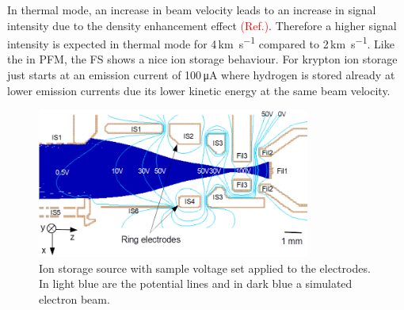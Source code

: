 		In thermal mode, an increase in beam velocity leads to an increase in signal intensity due to the density enhancement effect \textcolor{red}{(Ref.)}. Therefore a higher signal intensity is expected in thermal mode for 4\,\si{\kilo\meter\per\second} compared to 2\,\si{\kilo\meter\per\second}. 
		Like the in PFM, the FS shows a nice ion storage behaviour. For krypton ion storage just starts at an emission current of 100\,\si{\micro\ampere} where hydrogen is stored already at lower emission currents due its lower kinetic energy at the same beam velocity.
		
		\begin{figure}[h]
			\centering
			\includegraphics[width = 0.8\textwidth]{Experiments/FiL_IS_elBeam_Storage.png}
			\caption{Ion storage source with sample voltage set applied to the electrodes. In light blue are the potential lines and in dark blue a simulated electron beam.}
			\label{fig:ExpFSFlightSenIonStorIS}
		\end{figure}
		
